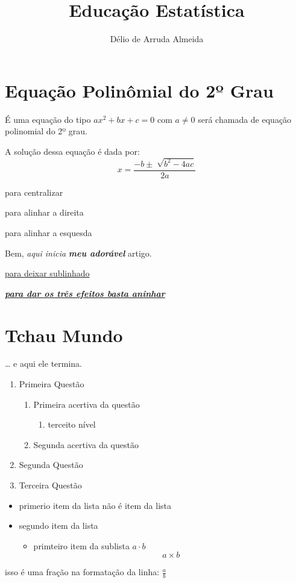 \documentclass[a4paper,12pt]{article}
\author{Délio de Arruda Almeida}
\title{Educação Estatística}
\begin{document}
   \maketitle
   \tableofcontents

   \section{Equação Polinômial do 2º Grau}
     É uma equação do tipo $ax^2+bx+c=0$ com $a\neq 0$ será chamada de        equação polinomial do 2º grau.

   A solução dessa equação é dada por: $$x=\frac{-b\pm\sqrt[]{b^2-4ac}}{2a}$$

   \begin{center}
   para centralizar 
   \end{center}
   \begin{flushright}
   para alinhar a direita
   \end{flushright}
   \begin{flushleft}
   para alinhar a esquesda
   \end{flushleft}

   Bem, \textit{aqui inicia} \textit{\textbf{meu adorável}} artigo.

   \underline{para deixar sublinhado}

   \textbf{\textit{\underline{para dar os três efeitos basta aninhar}}}
   \section{Tchau Mundo}
   \ldots{} e aqui ele termina.
   \begin{enumerate}
       \item Primeira Questão
          \begin{enumerate}
             \item Primeira acertiva da questão
                \begin{enumerate}
                   \item terceito nível
                \end{enumerate}
             \item Segunda acertiva da questão
          \end{enumerate}

       \item Segunda Questão
       \item Terceira Questão 
   \end{enumerate}
   \begin{itemize}
      \item primerio item da lista
       não é item da lista
      \item segundo item da lista
          \begin{itemize}
            \item primteiro item da sublista
            $a \cdot b$ $$ a\times b $$
          \end{itemize}
   \end{itemize}
   isso é uma fração na formatação da linha: $\frac{a}{b}$ 
   
\end{document}
